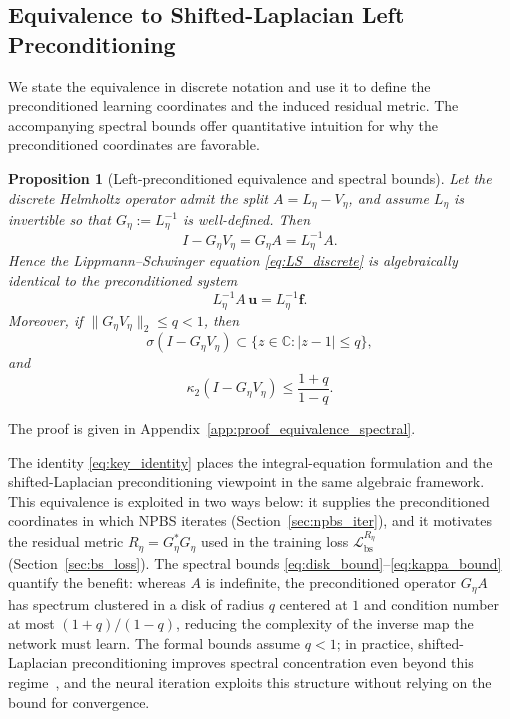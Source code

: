 \documentclass{article}
\theoremstyle{plain}
\newtheorem{proposition}{Proposition}[section]
\theoremstyle{remark}
\begin{document}
\subsection{Equivalence to Shifted-Laplacian Left Preconditioning}
We state the equivalence in discrete notation and use it to define the preconditioned learning coordinates and the induced residual metric. The accompanying spectral bounds offer quantitative intuition for why the preconditioned coordinates are favorable.

\begin{proposition}[Left-preconditioned equivalence and spectral bounds]
\label{prop:equivalence_spectral}
Let the discrete Helmholtz operator admit the split $A=L_\eta - V_\eta$, and assume $L_\eta$ is invertible so that $G_\eta := L_\eta^{-1}$ is well-defined.
Then
\begin{equation}
I - G_\eta V_\eta = G_\eta A = L_\eta^{-1}A.
\label{eq:key_identity}
\end{equation}
Hence the Lippmann--Schwinger equation \eqref{eq:LS_discrete} is algebraically identical to the preconditioned system
\begin{equation}
L_\eta^{-1}A\,\bm u = L_\eta^{-1}\bm f.
\end{equation}
Moreover, if $\|G_\eta V_\eta\|_2\le q<1$, then
\begin{equation}
\sigma(I-G_\eta V_\eta)\subset\{z\in\mathbb{C}:|z-1|\le q\},
\label{eq:disk_bound}
\end{equation}
and
\begin{equation}
\kappa_2(I-G_\eta V_\eta)\le \frac{1+q}{1-q}.
\label{eq:kappa_bound}
\end{equation}
\end{proposition}

The proof is given in Appendix~\ref{app:proof_equivalence_spectral}.

The identity \eqref{eq:key_identity} places the integral-equation formulation and the shifted-Laplacian preconditioning viewpoint in the same algebraic framework. This equivalence is exploited in two ways below: it supplies the preconditioned coordinates in which NPBS iterates (Section~\ref{sec:npbs_iter}), and it motivates the residual metric $R_\eta = G_\eta^\ast G_\eta$ used in the training loss $\mathcal{L}_{\mathrm{bs}}^{R_\eta}$ (Section~\ref{sec:bs_loss}). The spectral bounds \eqref{eq:disk_bound}--\eqref{eq:kappa_bound} quantify the benefit: whereas $A$ is indefinite, the preconditioned operator $G_\eta A$ has spectrum clustered in a disk of radius $q$ centered at $1$ and condition number at most $(1+q)/(1-q)$, reducing the complexity of the inverse map the network must learn. The formal bounds assume $q<1$; in practice, shifted-Laplacian preconditioning improves spectral concentration even beyond this regime~\cite{erlangga2006novel}, and the neural iteration exploits this structure without relying on the bound for convergence.
\end{document}
